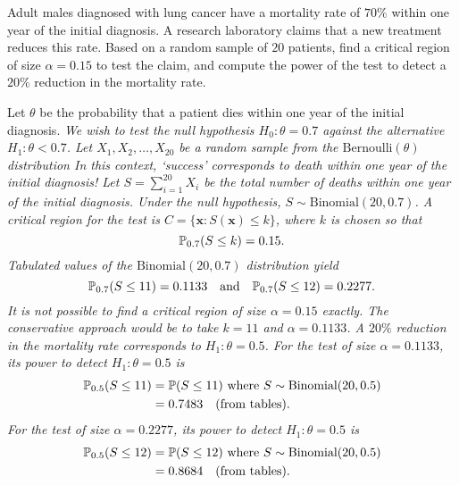 \begin{exercise}
\begin{questions}
\question
Adult males diagnosed with lung cancer have a mortality rate of $70\%$ within one year of the initial diagnosis. A research laboratory claims that a new treatment reduces this rate. Based on a random sample of $20$ patients, find a critical region of size $\alpha=0.15$ to test the claim, and compute the power of the test to detect a $20\%$ reduction in the mortality rate.
\begin{answer}
Let $\theta$ be the probability that a patient dies within one year of the initial diagnosis.
\bit
\it We wish to test the null hypothesis $H_0:\theta=0.7$ against the alternative $H_1:\theta<0.7$.
\eit
Let $X_1,X_2,\ldots,X_{20}$ be a random sample from the $\text{Bernoulli}(\theta)$ distribution
\bit
\it In this context, `success' corresponds to death within one year of the initial diagnosis!
\eit
Let $S=\sum_{i=1}^{20} X_i$ be the total number of deaths within one year of the initial diagnosis.
\bit
\it Under the null hypothesis, $S\sim\text{Binomial}(20,0.7)$.
\eit
A critical region for the test is $C=\{\mathbf{x}:S(\mathbf{x})\leq k\}$, where $k$ is chosen so that 
\[
\mathbb{P}_{0.7}(S\leq k) = 0.15.
\]
Tabulated values of the $\text{Binomial}(20,0.7)$ distribution yield
\[
\mathbb{P}_{0.7}(S\leq 11) = 0.1133 \text{\quad and\quad}\mathbb{P}_{0.7}(S\leq 12) = 0.2277.
\]
\bit
\it It is not possible to find a critical region of size $\alpha=0.15$ exactly.
\eit
The conservative approach would be to take $k=11$ and $\alpha=0.1133$.
\bit
\it A $20\%$ reduction in the mortality rate corresponds to $H_1:\theta=0.5$.
\eit
For the test of size $\alpha=0.1133$, its power to detect $H_1:\theta=0.5$ is
\begin{align*}
\mathbb{P}_{0.5}(S\leq 11) 
	& = \mathbb{P}(S\leq 11) \text{ where } S\sim\text{Binomial}(20,0.5) \\
	& = 0.7483 \text{\quad (from tables)}.
\end{align*}
For the test of size $\alpha=0.2277$, its power to detect $H_1:\theta=0.5$ is
\begin{align*}
\mathbb{P}_{0.5}(S\leq 12) 
	& = \mathbb{P}(S\leq 12) \text{ where } S\sim\text{Binomial}(20,0.5) \\
	& = 0.8684 \text{\quad (from tables)}.
\end{align*}
\end{answer}


\end{questions}
\end{exercise}
